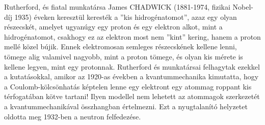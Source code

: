 \documentclass[../main.tex]{subfiles}
\begin{document}
Rutherford, és fiatal munkatársa James CHADWICK (1881-1974, fizikai Nobel-díj 1935) éveken keresztül keresték a ”kis
hidrogénatomot”, azaz egy olyan részecskét, amelyet ugyanúgy egy proton és egy elektron alkot, mint a hidrogénatomot, csakhogy ez az elektron most nem ”kint” kering, hanem a
proton mellé közel bújik. Ennek elektromosan semleges részecskének kellene lenni, tömege alig valamivel nagyobb, mint a proton tömege, és olyan kis mérete is kellene legyen,
mint egy protonnak. Rutherford és munkatársai felhagytak ezekkel a kutatásokkal, amikor az 1920-as években a kvantummechanika kimutatta, hogy a Coulomb-kölcsönhatás
képtelen lenne egy elektront egy atommag roppant kis térfogatában kötve tartani! Ilyen modellel nem lehetett az atommagok szerkezetét a kvantummechanikával összhangban
értelmezni. Ezt a nyugtalanító helyzetet oldotta meg 1932-ben a neutron felfedezése.
\end{document}
